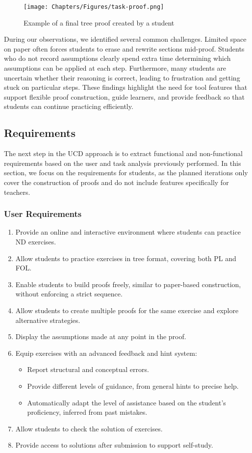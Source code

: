 \begin{figure}[h]
\centering
\texttt{[image: Chapters/Figures/task-proof.png]}
\caption{Example of a final tree proof created by a student}
\label{fig:task-proof}
\end{figure}

During our observations, we identified several common challenges. Limited space on paper often forces students to erase and rewrite sections mid-proof. Students who do not record assumptions clearly spend extra time determining which assumptions can be applied at each step. Furthermore, many students are uncertain whether their reasoning is correct, leading to frustration and getting stuck on particular steps. These findings highlight the need for tool features that support flexible proof construction, guide learners, and provide feedback so that students can continue practicing efficiently.


\subsection{Requirements}
The next step in the \gls{UCD} approach is to extract functional and non-functional requirements based on the user and task analysis previously performed. In this section, we focus on the requirements for students, as the planned iterations only cover the construction of proofs and do not include features specifically for teachers.

\subsubsection*{User Requirements}
\begin{enumerate}
    \item Provide an online and interactive environment where students can practice \gls{ND} exercises.
    \item Allow students to practice exercises in tree format, covering both \gls{PL} and \gls{FOL}.
    \item Enable students to build proofs freely, similar to paper-based construction, without enforcing a strict sequence.
    \item Allow students to create multiple proofs for the same exercise and explore alternative strategies.
    \item Display the assumptions made at any point in the proof.
    \item Equip exercises with an advanced feedback and hint system:
    \begin{itemize}
        \item Report structural and conceptual errors.
        \item Provide different levels of guidance, from general hints to precise help.
        \item Automatically adapt the level of assistance based on the student's proficiency, inferred from past mistakes.
    \end{itemize}
    \item Allow students to check the solution of exercises.
    \item Provide access to solutions after submission to support self-study.
\end{enumerate}

